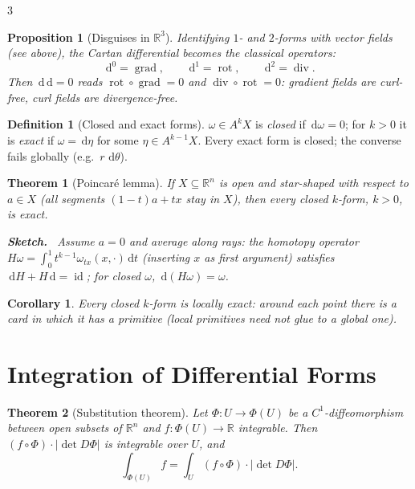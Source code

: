 \documentclass[10pt,a4paper,landscape]{article}
\theoremstyle{definition}
\newtheorem{defn}{Definition}[section]
\theoremstyle{plain}
\newtheorem{thm}{Theorem}[section]
\newtheorem{prop}{Proposition}[section]
\newtheorem{cor}{Corollary}[section]
\theoremstyle{remark}
\newcommand{\R}{\mathbb{R}}
\newcommand{\dd}{\,\mathrm{d}}
\newcommand{\id}{\operatorname{id}}
\newcommand{\abs}[1]{\lvert #1 \rvert}
\newcommand{\comp}{\circ}
\DeclareMathOperator{\grad}{grad}
\DeclareMathOperator{\rot}{rot}
\DeclareMathOperator{\Ddiv}{div}
\newenvironment{proofsketch}{%
  \par\small\color{exgray}\textbf{Sketch.}\ }%
  {\par}
\begin{document}
\begin{multicols*}{3}
\begin{prop}[Disguises in $\R^3$]
Identifying $1$- and $2$-forms with vector fields (see above), the Cartan differential becomes the classical operators:
\[
\dd^0 = \grad, \qquad \dd^1 = \rot, \qquad \dd^2 = \Ddiv .
\]
Then $\dd\dd = 0$ reads $\rot \comp \grad = 0$ and $\Ddiv \comp \rot = 0$: gradient fields are curl-free, curl fields are divergence-free.
\end{prop}

\begin{defn}[Closed and exact forms]
$\omega \in A^kX$ is \emph{closed} if $\dd\omega = 0$; for $k > 0$ it is \emph{exact} if $\omega = \dd\eta$ for some $\eta \in A^{k-1}X$. Every exact form is closed; the converse fails globally (e.g.\ $r\,\dd\theta$).
\end{defn}

\begin{thm}[Poincar\'e lemma]
If $X \subseteq \R^n$ is open and \emph{star-shaped} with respect to $a \in X$ (all segments $(1-t)a + tx$ stay in $X$), then every closed $k$-form, $k > 0$, is exact.
\begin{proofsketch}
Assume $a = 0$ and average along rays: the homotopy operator $H\omega = \int_0^1 t^{k-1} \omega_{tx}(x, \cdot)\dd t$ (inserting $x$ as first argument) satisfies $\dd H + H \dd = \id$; for closed $\omega$, $\dd(H\omega) = \omega$.
\end{proofsketch}
\end{thm}

\begin{cor}
Every closed $k$-form is \emph{locally} exact: around each point there is a card in which it has a primitive (local primitives need not glue to a global one).
\end{cor}

\section{Integration of Differential Forms}

\begin{thm}[Substitution theorem]
Let $\Phi: U \to \Phi(U)$ be a $C^1$-diffeomorphism between open subsets of $\R^n$ and $f: \Phi(U) \to \R$ integrable. Then $(f \comp \Phi)\cdot\abs{\det D\Phi}$ is integrable over $U$, and
\[
\int_{\Phi(U)} f = \int_U (f \comp \Phi) \cdot \abs{\det D\Phi} .
\]
\end{thm}


\end{multicols*}
\end{document}
